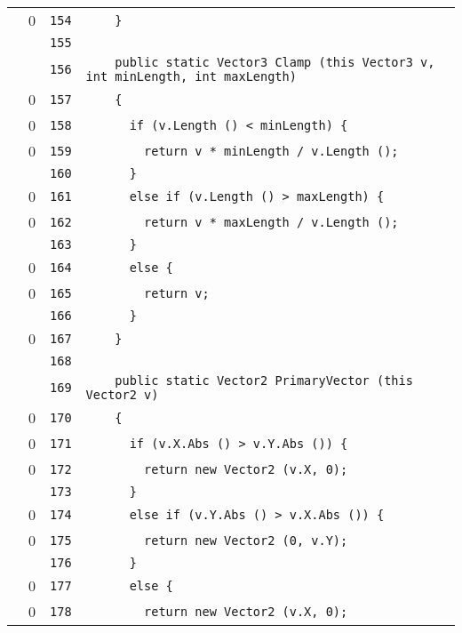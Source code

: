 \documentclass[a4paper,10pt]{article}
\begin{document}
\begin{longtable}[l]{lrrl}
\cellcolor{red} & 0 & \verb~154~ & \verb~    }~\\
\cellcolor{gray} &  & \verb~155~ & \verb~~\\
\cellcolor{gray} &  & \verb~156~ & \verb~    public static Vector3 Clamp (this Vector3 v, int minLength, int maxLength)~\\
\cellcolor{red} & 0 & \verb~157~ & \verb~    {~\\
\cellcolor{red} & 0 & \verb~158~ & \verb~      if (v.Length () < minLength) {~\\
\cellcolor{red} & 0 & \verb~159~ & \verb~        return v * minLength / v.Length ();~\\
\cellcolor{gray} &  & \verb~160~ & \verb~      }~\\
\cellcolor{red} & 0 & \verb~161~ & \verb~      else if (v.Length () > maxLength) {~\\
\cellcolor{red} & 0 & \verb~162~ & \verb~        return v * maxLength / v.Length ();~\\
\cellcolor{gray} &  & \verb~163~ & \verb~      }~\\
\cellcolor{red} & 0 & \verb~164~ & \verb~      else {~\\
\cellcolor{red} & 0 & \verb~165~ & \verb~        return v;~\\
\cellcolor{gray} &  & \verb~166~ & \verb~      }~\\
\cellcolor{red} & 0 & \verb~167~ & \verb~    }~\\
\cellcolor{gray} &  & \verb~168~ & \verb~~\\
\cellcolor{gray} &  & \verb~169~ & \verb~    public static Vector2 PrimaryVector (this Vector2 v)~\\
\cellcolor{red} & 0 & \verb~170~ & \verb~    {~\\
\cellcolor{red} & 0 & \verb~171~ & \verb~      if (v.X.Abs () > v.Y.Abs ()) {~\\
\cellcolor{red} & 0 & \verb~172~ & \verb~        return new Vector2 (v.X, 0);~\\
\cellcolor{gray} &  & \verb~173~ & \verb~      }~\\
\cellcolor{red} & 0 & \verb~174~ & \verb~      else if (v.Y.Abs () > v.X.Abs ()) {~\\
\cellcolor{red} & 0 & \verb~175~ & \verb~        return new Vector2 (0, v.Y);~\\
\cellcolor{gray} &  & \verb~176~ & \verb~      }~\\
\cellcolor{red} & 0 & \verb~177~ & \verb~      else {~\\
\cellcolor{red} & 0 & \verb~178~ & \verb~        return new Vector2 (v.X, 0);~\\

\end{longtable}
\end{document}
